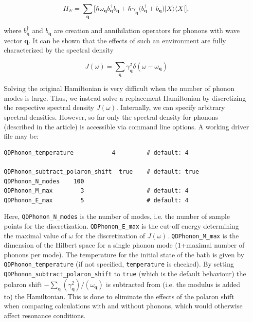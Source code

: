 \documentclass{scrartcl}
\begin{document}
\begin{equation}
H_E=\sum_{\mathbf{q}}\bigg[
\hbar\omega_{\mathbf{q}} b^\dagger_{\mathbf{q}}b_{\mathbf{q}}+
\hbar\gamma_{\mathbf{q}} \big( b^\dagger_{\mathbf{q}}+b_{\mathbf{q}}\big)
|X\rangle\langle X|\bigg],
\end{equation}

where $b^\dagger_{\mathbf{q}}$ and $b_{\mathbf{q}}$ are creation and
annihilation operators for phonons with wave vector $\mathbf{q}$.
It can be shown that the effects of such an environment are fully
characterized by the spectral density

\begin{equation}
J(\omega)=\sum_{\mathbf{q}} 
\gamma^2_{\mathbf{q}} \delta(\omega-\omega_{\mathbf{q}})
\end{equation}

Solving the original Hamiltonian is very difficult when the number of
phonon modes is large. Thus, we instead solve a replacement Hamiltonian 
by discretizing the respective spectral density $J(\omega)$. 
Internally, we can specify arbitrary spectral densities. However, so far only
the spectral density for phonons (described in the article) is accessible
via command line options.
A working driver file may be:

\begin{verbatim}
QDPhonon_temperature           4         # default: 4

QDPhonon_subtract_polaron_shift  true    # default: true   
QDPhonon_N_modes    100          
QDPhonon_M_max        3                  # default: 4
QDPhonon_E_max        5                  # default: 4
\end{verbatim}

Here, \verb+QDPhonon_N_modes+ is the number of modes, i.e. the 
number of sample points for the discretization.
\verb+QDPhonon_E_max+ is the cut-off energy determining the maximal 
value of $\omega$ for the discretization of $J(\omega)$. 
\verb+QDPhonon_M_max+ is the dimension of the Hilbert space for a single 
phonon mode (1+maximal number of phonons per mode). 
The temperature for the initial state of the bath is given by
\verb+QDPhonon_temperature+ (if not specified, \verb+temperature+ is checked).
By setting \verb+QDPhonon_subtract_polaron_shift+ to \verb+true+ (which is
the default behaviour) the polaron shift 
$-\sum_{\mathbf{q}}(\gamma^2_{\mathbf{q}})/(\omega_{\mathbf{q}})$ 
is subtracted from (i.e. the modulus is added to) the Hamiltonian. 
This is done to eliminate the effects of the polaron shift when comparing
calculations with and without phonons, which would otherwise affect 
resonance conditions.
\end{document}
